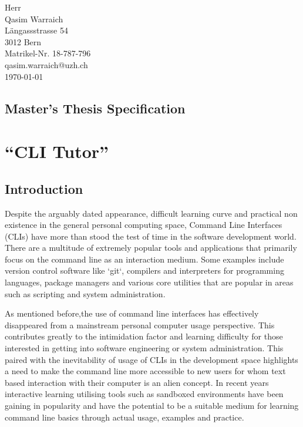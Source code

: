\documentclass{task_description}
\begin{document}
\thispagestyle{firstpage}
\vspace*{23mm}%
\hfill\parbox[t]{65mm}{
Herr\\
Qasim Warraich\\
Längassstrasse 54\\
3012 Bern \\[3mm]
Matrikel-Nr. 18-787-796 \\
qasim.warraich@uzh.ch\\[15mm]
\today \\
}
\vspace*{5mm}

\subsection*{Master's Thesis Specification}

\section*{``CLI Tutor''}

\subsection*{Introduction}

Despite the arguably dated appearance, difficult learning curve and practical
non existence in the general personal computing space, Command Line Interfaces
(CLIs) have more than stood the test of time in the software development world.
There are a multitude of extremely popular tools and applications that
primarily focus on the command line as an interaction medium. Some examples
include version control software like `git`, compilers and interpreters for
programming languages, package managers and various core utilities that are
popular in areas such as scripting and system administration.

As mentioned before,the use of command line interfaces has effectively
disappeared from a mainstream personal computer usage perspective. This
contributes greatly to the intimidation factor and learning difficulty for
those interested in getting into software engineering or system administration.
This paired with the inevitability of usage of CLIs in the development space
highlights a need to make the command line more accessible to new users for
whom text based interaction with their computer is an alien concept. In recent
years interactive learning utilising tools such as sandboxed environments have
been gaining in popularity and have the potential to be a suitable medium for
learning command line basics through actual usage, examples and practice. 
\end{document}
